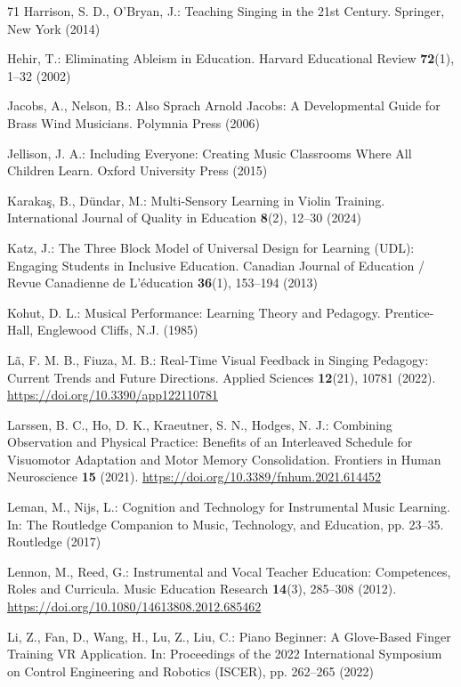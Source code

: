 \documentclass[runningheads]{llncs}
\begin{document}
\begin{thebibliography}{71}
Harrison, S. D., O’Bryan, J.: Teaching Singing in the 21st Century. Springer, New York (2014)

Hehir, T.: Eliminating Ableism in Education. Harvard Educational Review \textbf{72}(1), 1--32 (2002)

Jacobs, A., Nelson, B.: Also Sprach Arnold Jacobs: A Developmental Guide for Brass Wind Musicians. Polymnia Press (2006)

Jellison, J. A.: Including Everyone: Creating Music Classrooms Where All Children Learn. Oxford University Press (2015)

Karakaş, B., Dündar, M.: Multi-Sensory Learning in Violin Training. International Journal of Quality in Education \textbf{8}(2), 12--30 (2024)

Katz, J.: The Three Block Model of Universal Design for Learning (UDL): Engaging Students in Inclusive Education. Canadian Journal of Education / Revue Canadienne de L’éducation \textbf{36}(1), 153--194 (2013)

Kohut, D. L.: Musical Performance: Learning Theory and Pedagogy. Prentice-Hall, Englewood Cliffs, N.J. (1985)

Lã, F. M. B., Fiuza, M. B.: Real-Time Visual Feedback in Singing Pedagogy: Current Trends and Future Directions. Applied Sciences \textbf{12}(21), 10781 (2022). \url{https://doi.org/10.3390/app122110781}

Larssen, B. C., Ho, D. K., Kraeutner, S. N., Hodges, N. J.: Combining Observation and Physical Practice: Benefits of an Interleaved Schedule for Visuomotor Adaptation and Motor Memory Consolidation. Frontiers in Human Neuroscience \textbf{15} (2021). \url{https://doi.org/10.3389/fnhum.2021.614452}

Leman, M., Nijs, L.: Cognition and Technology for Instrumental Music Learning. In: The Routledge Companion to Music, Technology, and Education, pp. 23--35. Routledge (2017)

Lennon, M., Reed, G.: Instrumental and Vocal Teacher Education: Competences, Roles and Curricula. Music Education Research \textbf{14}(3), 285--308 (2012). \url{https://doi.org/10.1080/14613808.2012.685462}

Li, Z., Fan, D., Wang, H., Lu, Z., Liu, C.: Piano Beginner: A Glove-Based Finger Training VR Application. In: Proceedings of the 2022 International Symposium on Control Engineering and Robotics (ISCER), pp. 262--265 (2022)


\end{thebibliography}
\end{document}

